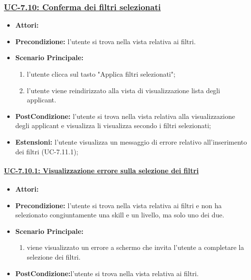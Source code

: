 \subsubsection{\underline{UC-7.10: Conferma dei filtri selezionati}}
\begin{itemize}
\item \textbf{Attori:}\loggedusr
\item \textbf{Precondizione:} l'utente si trova nella vista relativa ai filtri.
\item \textbf{Scenario Principale:}
\begin{enumerate}
	\item l'utente clicca sul tasto "Applica filtri selezionati";
	\item l'utente viene reindirizzato alla vista di visualizzazione lista degli applicant.
\end{enumerate}
\item \textbf{PostCondizione:} l'utente si trova nella vista relativa alla visualizzazione degli applicant e visualizza li visualizza secondo i filtri selezionati;
\item \textbf{Estensioni:} l'utente visualizza un messaggio di errore relativo all'inserimento dei filtri (UC-7.11.1);
\end{itemize}

\paragraph{\underline{UC-7.10.1: Visualizzazione errore sulla selezione dei filtri}}
\begin{itemize}
\item \textbf{Attori:}\loggedusr
\item \textbf{Precondizione:} l'utente si trova nella vista relativa ai filtri e non ha selezionato congiuntamente una skill e un livello, ma solo uno dei due.
\item \textbf{Scenario Principale:}
\begin{enumerate}
	\item viene visualizzato un errore a schermo che invita l'utente a completare la selezione dei filtri.
\end{enumerate}
\item \textbf{PostCondizione:}l'utente si trova nella vista relativa ai filtri.
\end{itemize}


